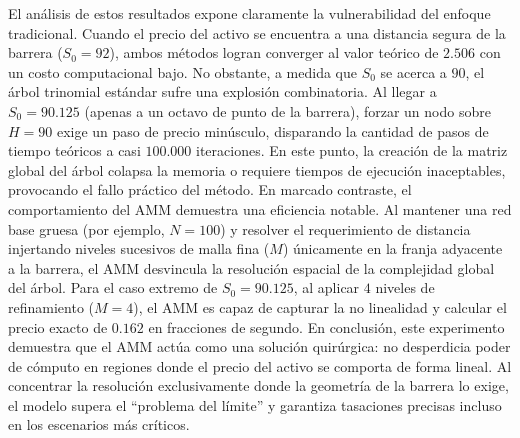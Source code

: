 \begin{table}[H]
  \centering
  \caption{Comparación de métodos numéricos para valoración de Down-and-Out Call cerca de la barrera. Los parámetros son: $K=100$, $H=90$, $T=1$ año, $r=0.10$, $d=0.05$, $\sigma=0.25$.}
  \label{tab:comparacion_metodos_barrera}
\end{table}

El análisis de estos resultados expone claramente la vulnerabilidad del enfoque tradicional. Cuando el precio del activo se encuentra a una distancia segura de la barrera ($S_0=92$), ambos métodos logran converger al valor teórico de $2.506$ con un costo computacional bajo. No obstante, a medida que $S_0$ se acerca a $90$, el árbol trinomial estándar sufre una explosión combinatoria. Al llegar a $S_0=90.125$ (apenas a un octavo de punto de la barrera), forzar un nodo sobre $H=90$ exige un paso de precio minúsculo, disparando la cantidad de pasos de tiempo teóricos a casi $100.000$ iteraciones. En este punto, la creación de la matriz global del árbol colapsa la memoria o requiere tiempos de ejecución inaceptables, provocando el fallo práctico del método.
En marcado contraste, el comportamiento del AMM demuestra una eficiencia notable. Al mantener una red base gruesa (por ejemplo, $N=100$) y resolver el requerimiento de distancia injertando niveles sucesivos de malla fina ($M$) únicamente en la franja adyacente a la barrera, el AMM desvincula la resolución espacial de la complejidad global del árbol. Para el caso extremo de $S_0=90.125$, al aplicar $4$ niveles de refinamiento ($M=4$), el AMM es capaz de capturar la no linealidad y calcular el precio exacto de $0.162$ en fracciones de segundo.
En conclusión, este experimento demuestra que el AMM actúa como una solución quirúrgica: no desperdicia poder de cómputo en regiones donde el precio del activo se comporta de forma lineal. Al concentrar la resolución exclusivamente donde la geometría de la barrera lo exige, el modelo supera el ``problema del límite'' y garantiza tasaciones precisas incluso en los escenarios más críticos.

